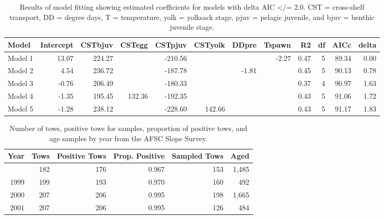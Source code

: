 \documentclass[
  english,
]{article}
\begin{document}
\begin{longtable}{lrrrrrrrrrrr}

\caption{\label{tbl-rec-index-aic}Results of model fitting showing
estimated coefficients for models with delta AIC \textless/= 2.0. CST =
cross-shelf transport, DD = degree days, T = temperature, yolk =
yolksack stage, pjuv = pelagic juvenile, and bjuv = benthic juvenile
stage.}

\tabularnewline

\toprule
Model & Intercept & CSTbjuv & CSTegg & CSTpjuv & CSTyolk & DDpre & Tspawn & R2 & df & AICc & delta \\ 
\midrule\addlinespace[2.5pt]
Model 1 & 13.07 & 224.27 &  & -210.56 &  &  & -2.27 & 0.47 & 5 & 89.34 & 0.00 \\ 
Model 2 & 4.54 & 236.72 &  & -187.78 &  & -1.81 &  & 0.45 & 5 & 90.13 & 0.78 \\ 
Model 3 & -0.76 & 206.49 &  & -180.33 &  &  &  & 0.37 & 4 & 90.97 & 1.63 \\ 
Model 4 & -1.35 & 195.45 & 132.36 & -192.35 &  &  &  & 0.43 & 5 & 91.06 & 1.72 \\ 
Model 5 & -1.28 & 238.12 &  & -228.60 & 142.66 &  &  & 0.43 & 5 & 91.17 & 1.83 \\ 
\bottomrule

\end{longtable}

\endgroup

\newpage{}

\begingroup
\fontsize{9.0pt}{11.0pt}\selectfont

\begin{longtable}{rrrrrr}

\caption{\label{tbl-afslope-samples}Number of tows, positive tows for
samples, proportion of positive tows, and age samples by year from the
AFSC Slope Survey.}

\tabularnewline

\toprule
Year & Tows & Positive Tows & Prop. Positive & Sampled Tows & Aged \\ 
\midrule\addlinespace[2.5pt]
1997 & 182 & 176 & 0.967 & 153 & 1,485 \\ 
1999 & 199 & 193 & 0.970 & 160 & 492 \\ 
2000 & 207 & 206 & 0.995 & 198 & 1,665 \\ 
2001 & 207 & 206 & 0.995 & 126 & 484 \\ 
\bottomrule

\end{longtable}
\end{document}
